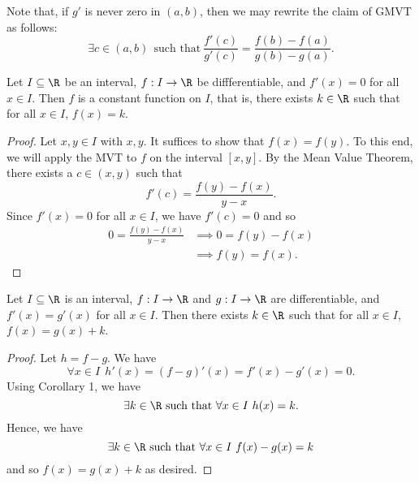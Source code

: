 \begin{remark}
    Note that, if \( g'  \) is never zero in \( (a,b) \), then we may rewrite the claim of GMVT as follows:
    \[  \exists c \in (a,b) \ \ \text{such that} \ \frac{ f'(c) }{  g'(c) } =  \frac{ f(b) - f(a) }{  g(b) - g(a) }. \]
\end{remark}

\begin{corollary}[Corollary 1]
    Let \( I \subseteq  \R   \) be an interval, \( f : I \to \R  \) be diffferentiable, and \( f'(x) = 0  \) for all \( x \in I  \). Then \( f  \) is a constant function on \( I  \), that is, there exists \( k \in \R  \) such that for all \( x \in I  \), \( f(x) = k  \). 
\end{corollary}

\begin{proof}
    Let \( x,y \in I  \) with \( x , y  \). It suffices to show that \( f(x) = f(y) \). To this end, we will apply the MVT to \( f  \) on the interval \( [x,y] \). By the Mean Value Theorem, there exists a \( c \in (x,y) \) such that 
    \[  f'(c) = \frac{ f(y) - f(x)  }{  y - x  }. \]
    Since \( f'(x) = 0  \) for all \( x \in I  \), we have \( f'(c) = 0  \) and so
    \begin{align*}
        0 = \frac{ f(y) - f(x) }{  y - x  }  &\implies 0 = f(y) - f(x)   \\
                                             &\implies f(y) = f(x).
    \end{align*}
\end{proof}

\begin{corollary}
    Let \( I \subseteq  \R   \) is an interval, \( f: I \to \R  \) and \( g: I \to \R  \) are differentiable, and \( f'(x) = g'(x) \) for all \( x \in I  \). Then there exists \( k \in \R  \) such that for all \( x \in I  \), \( f(x) = g(x) + k  \).
\end{corollary}

\begin{proof}
Let \( h = f - g  \). We have 
\[  \forall x \in I \ \ h'(x) = (f - g )'(x) = f'(x) - g'(x) = 0.  \]
Using Corollary 1, we have  
\[  \exists k \in \R \ \text{such that} \ \forall x \in I \ h(x) = k.  \]
Hence, we have 
\[  \exists k \in \R \  \text{such that} \ \forall x \in I \ f(x) - g(x) = k  \]
and so \( f(x) = g(x) + k  \) as desired.
\end{proof}

